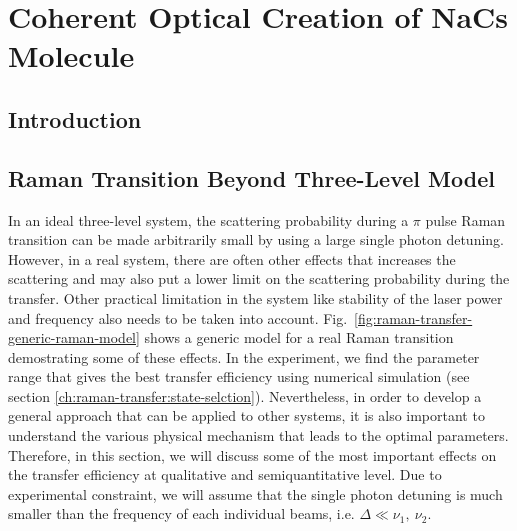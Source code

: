 
\chapter{Coherent Optical Creation of NaCs Molecule}
\label{ch:raman-transfer}

\section{Introduction}


\section{Raman Transition Beyond Three-Level Model}

In an ideal three-level system, the scattering probability during a $\pi$ pulse
Raman transition can be made arbitrarily small by using a large single photon detuning.
However, in a real system, there are often other effects that increases the scattering
and may also put a lower limit on the scattering probability during the transfer.
Other practical limitation in the system like stability of the laser power and frequency
also needs to be taken into account.
Fig.~\ref{fig:raman-transfer-generic-raman-model} shows a generic model
for a real Raman transition demostrating some of these effects.
In the experiment, we find the parameter range that gives the best transfer efficiency
using numerical simulation (see section \ref{ch:raman-transfer:state-selction}).
Nevertheless, in order to develop a general approach that can be applied to other systems,
it is also important to understand the various physical mechanism that leads
to the optimal parameters.
Therefore, in this section, we will discuss some of the most important effects
on the transfer efficiency at qualitative and semiquantitative level.
Due to experimental constraint, we will assume that the single photon detuning is
much smaller than the frequency of each individual beams, i.e. $\Delta\ll\nu_1,\ \nu_2$.

